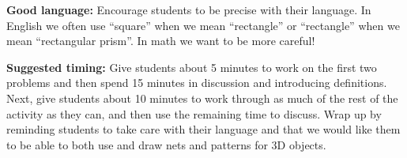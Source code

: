 \documentclass[nooutcomes,noauthor]{ximera}
\begin{document}
\begin{instructorNotes}
{\bf Good language:} Encourage students to be precise with their language. In English we often use ``square'' when we mean ``rectangle'' or ``rectangle'' when we mean ``rectangular prism''. In math we want to be more careful!



{\bf Suggested timing:} Give students about 5 minutes to work on the first two problems and then spend 15 minutes in discussion and introducing definitions. Next, give students about 10 minutes to work through as much of the rest of the activity as they can, and then use the remaining time to discuss. Wrap up by reminding students to take care with their language and that we would like them to be able to both use and draw nets and patterns for 3D objects.




\end{instructorNotes}
\end{document}
